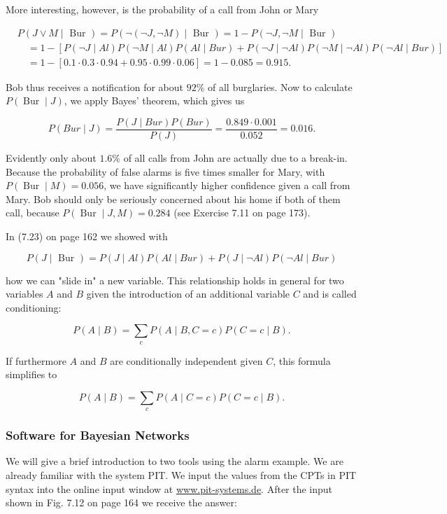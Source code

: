 \documentclass[10pt]{article}
\begin{document}
More interesting, however, is the probability of a call from John or Mary

$$
\begin{aligned}
& P(J \vee M \mid \text { Bur })=P(\neg(\neg J, \neg M) \mid \text { Bur })=1-P(\neg J, \neg M \mid \text { Bur }) \\
& \quad=1-[P(\neg J \mid A l) P(\neg M \mid A l) P(A l \mid B u r)+P(\neg J \mid \neg A l) P(\neg M \mid \neg A l) P(\neg A l \mid B u r)] \\
& \quad=1-[0.1 \cdot 0.3 \cdot 0.94+0.95 \cdot 0.99 \cdot 0.06]=1-0.085=0.915 .
\end{aligned}
$$

Bob thus receives a notification for about $92 \%$ of all burglaries. Now to calculate $P(\operatorname{Bur} \mid J)$, we apply Bayes' theorem, which gives us

$$
P(B u r \mid J)=\frac{P(J \mid B u r) P(B u r)}{P(J)}=\frac{0.849 \cdot 0.001}{0.052}=0.016 .
$$

Evidently only about $1.6 \%$ of all calls from John are actually due to a break-in. Because the probability of false alarms is five times smaller for Mary, with $P(\operatorname{Bur} \mid M)=0.056$, we have significantly higher confidence given a call from Mary. Bob should only be seriously concerned about his home if both of them call, because $P(\operatorname{Bur} \mid J, M)=0.284$ (see Exercise 7.11 on page 173).

In (7.23) on page 162 we showed with

$$
P(J \mid \text { Bur })=P(J \mid A l) P(A l \mid B u r)+P(J \mid \neg A l) P(\neg A l \mid B u r)
$$

how we can "slide in" a new variable. This relationship holds in general for two variables $A$ and $B$ given the introduction of an additional variable $C$ and is called conditioning:

$$
P(A \mid B)=\sum_{c} P(A \mid B, C=c) P(C=c \mid B) .
$$

If furthermore $A$ and $B$ are conditionally independent given $C$, this formula simplifies to

$$
P(A \mid B)=\sum_{c} P(A \mid C=c) P(C=c \mid B) .
$$

\subsubsection*{Software for Bayesian Networks}
We will give a brief introduction to two tools using the alarm example. We are already familiar with the system PIT. We input the values from the CPTs in PIT syntax into the online input window at \href{http://www.pit-systems.de}{www.pit-systems.de}. After the input shown in Fig. 7.12 on page 164 we receive the answer:
\end{document}
